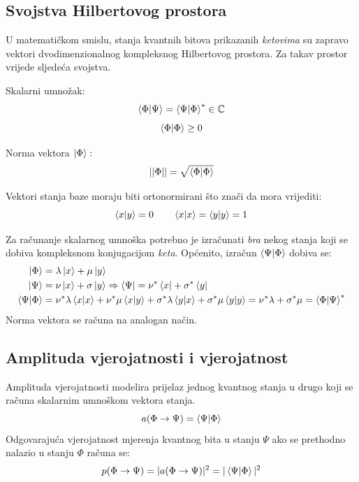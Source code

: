 \subsection{Svojstva Hilbertovog prostora}
U matematičkom smislu, stanja kvantnih bitova prikazanih \textit{ketovima} su zapravo vektori dvodimenzionalnog kompleksnog Hilbertovog prostora. Za takav prostor vrijede sljedeća svojstva.

Skalarni umnožak:
\begin{equation}
\braket{\Phi|\Psi} = \braket{\Psi|\Phi}^* \in \mathbb{C}
\end{equation}
\begin{equation}
\braket{\Phi|\Phi} \geq 0
\end{equation}

Norma vektora $\ket{\Phi}:$
\begin{equation}
||\Phi|| = \sqrt{\braket{\Phi|\Phi}}
\end{equation}

Vektori stanja baze moraju biti ortonormirani što znači da mora vrijediti:
\begin{equation}
\braket{x|y} = 0
\qquad
\braket{x|x} = \braket{y|y} = 1
\end{equation}

Za računanje skalarnog umnoška potrebno je izračunati \textit{bra} nekog stanja koji se dobiva kompleksnom konjugacijom \textit{keta}. Općenito, izračun $\braket{\Psi|\Phi}$ dobiva se:
\begin{align*}
\ket{\Phi} &= \lambda\ket{x} + \mu\ket{y} \\
\ket{\Psi} &= \nu\ket{x} + \sigma\ket{y} \Rightarrow \bra{\Psi} = \nu^*\bra{x} + \sigma^*\bra{y} \\
\braket{\Psi|\Phi} &= \nu^*\lambda\braket{x|x} + \nu^*\mu\braket{x|y} + \sigma^*\lambda\braket{y|x} + \sigma^*\mu\braket{y|y} = \nu^*\lambda + \sigma^*\mu = \braket{\Phi|\Psi}^*
\end{align*}
Norma vektora se računa na analogan način.

\subsection{Amplituda vjerojatnosti i vjerojatnost}

Amplituda vjerojatnosti modelira prijelaz jednog kvantnog stanja u drugo koji se računa skalarnim umnoškom vektora stanja.
\begin{equation}
a(\Phi \rightarrow \Psi) = \braket{\Psi|\Phi}
\end{equation}
Odgovarajuća vjerojatnost mjerenja kvantnog bita u stanju $\Psi$ ako se prethodno nalazio u stanju $\Phi$ računa se:
\begin{equation}
p(\Phi \rightarrow \Psi) = |a(\Phi \rightarrow \Psi)|^2 = |\braket{\Psi|\Phi}|^2
\end{equation}

